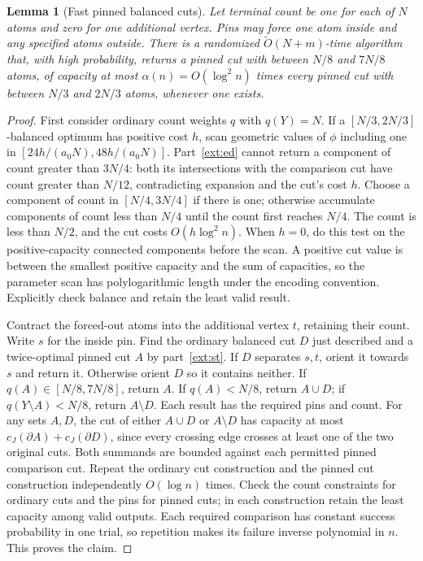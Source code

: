 \documentclass[11pt]{article}
\newtheorem{lemma}[theorem]{Lemma}
\theoremstyle{definition}
\newcommand{\wt}{\widetilde}
\newcommand{\cut}{\partial}
\begin{document}
\begin{lemma}[Fast pinned balanced cuts]\label{lem:fast-cut}
Let terminal count be one for each of $N$ atoms and zero for one additional
vertex. Pins may force one atom inside and any specified atoms outside.
There is a randomized $\wt O(N+m)$-time algorithm that, with high
probability, returns a pinned cut with between $N/8$ and $7N/8$ atoms,
of capacity at most $\alpha(n)=O(\log^2 n)$ times
every pinned cut with between $N/3$ and $2N/3$ atoms, whenever one exists.
\end{lemma}
\begin{proof}
First consider ordinary count weights $q$ with $q(Y)=N$.
If a $[N/3,2N/3]$-balanced optimum has positive cost $h$, scan geometric
values of $\phi$ including one in $[24h/(a_0N),48h/(a_0N)]$.
Part~\ref{ext:ed} cannot return a component of count greater than $3N/4$:
both its intersections with the comparison cut have count greater than
$N/12$, contradicting expansion and the cut's cost $h$.
Choose a component of count in $[N/4,3N/4]$ if there is one; otherwise
accumulate components of count less than $N/4$ until the count first reaches
$N/4$. The count is less than $N/2$, and the cut costs $O(h\log^2 n)$.
When $h=0$, do this test on the positive-capacity connected components
before the scan. A positive cut value is between the smallest positive
capacity and the sum of capacities, so the parameter scan has
polylogarithmic length under the encoding convention. Explicitly check
balance and retain the least valid result.

Contract the forced-out atoms into the additional vertex $t$, retaining
their count. Write $s$ for the inside pin. Find the ordinary balanced cut
$D$ just described and a twice-optimal pinned cut $A$ by part~\ref{ext:st}.
If $D$ separates $s,t$, orient it towards $s$ and return it. Otherwise orient
$D$ so it contains neither. If $q(A)\in[N/8,7N/8]$, return $A$.
If $q(A)<N/8$, return $A\cup D$; if $q(Y\setminus A)<N/8$, return
$A\setminus D$. Each result has the required pins and count.
For any sets $A,D$, the cut of either $A\cup D$ or $A\setminus D$ has
capacity at most $c_J(\cut A)+c_J(\cut D)$, since every crossing edge
crosses at least one of the two original cuts. Both summands are bounded
against each permitted pinned comparison cut. Repeat the ordinary cut
construction and the pinned cut construction independently $O(\log n)$
times. Check the count constraints for ordinary cuts and the pins for
pinned cuts; in each construction retain the least capacity among valid
outputs. Each required comparison has constant success probability in
one trial, so repetition makes its failure inverse polynomial in $n$.
This proves the claim.
\end{proof}
\end{document}
